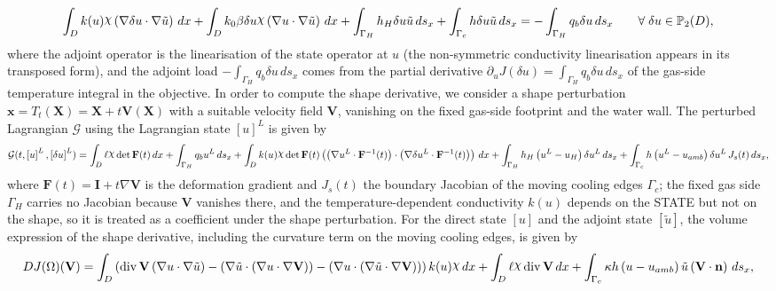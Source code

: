 \documentclass[preview]{standalone}
\let\oldcdot\cdot
\let\cdot\oldcdot
\begin{document}
\begin{dmath*}
\int_{D} k(u) \raisebox{\depth}{$\chi$} \left(  \nabla \delta u  \cdot  \nabla \tilde u  \right) \,dx + \int_{D} k_0 \beta \delta u \raisebox{\depth}{$\chi$} \left(  \nabla u  \cdot  \nabla \tilde u  \right) \,dx + \int_{\Gamma_H} h_H \delta u \tilde u \,ds_x + \int_{\Gamma_c} h \delta u \tilde u \,ds_x = - \int_{\Gamma_H} q_b \delta u \,ds_x \qquad \forall\; {\delta u\in \mathbb P_{2}(D)} ,
\end{dmath*}
where the adjoint operator is the linearisation of the state operator at $u$ (the non-symmetric conductivity linearisation appears in its transposed form), and the adjoint load $- \int_{\Gamma_H} q_b \delta u \,ds_x$ comes from the partial derivative $\partial_{u} J(\delta u) = \int_{\Gamma_H} q_b \delta u \,ds_x$ of the gas-side temperature integral in the objective.
In order to compute the shape derivative, we consider a shape perturbation $\mathbf x = T_t(\mathbf X) = \mathbf X + t \mathbf  V(\mathbf X)$ with a suitable velocity field $\mathbf V$, vanishing on the fixed gas-side footprint and the water wall.  The perturbed Lagrangian $\mathcal G$ using the Lagrangian state $\left[ u\right]^{L}$ is given by
\begin{dmath*}
\mathcal G(t,\left[ u\right]^{L},\left[ \delta u\right]^{L}) = \int_{D} \ell \raisebox{\depth}{$\chi$}  \operatorname{det}\mathbf F( t )  \,dx + \int_{\Gamma_H} q_b u^{L} \,ds_x +  \int_{D} k(u) \raisebox{\depth}{$\chi$}  \operatorname{det}\mathbf F( t )  \left( \left(  \nabla u^{L} \cdot  \mathbf F^{-1}(t) \right) \cdot \left(  \nabla \delta u^{L} \cdot  \mathbf F^{-1}(t) \right) \right) \,dx + \int_{\Gamma_H} h_H \left( u^{L} - u_{H}\right) \delta u^{L} \,ds_x + \int_{\Gamma_c} h \left( u^{L} - u_{amb}\right) \delta u^{L} \,J_{s}(t) \,ds_x ,
\end{dmath*}
where $\mathbf F(t) = \mathbf I + t \nabla \mathbf V$ is the deformation gradient and $J_{s}(t)$ the boundary Jacobian of the moving cooling edges $\Gamma_c$; the fixed gas side $\Gamma_H$ carries no Jacobian because $\mathbf V$ vanishes there, and the temperature-dependent conductivity $k(u)$ depends on the STATE but not on the shape, so it is treated as a coefficient under the shape perturbation.
For the direct state $\left[ u\right]$ and the adjoint state $\left[ \tilde u\right]$, the volume expression of the shape derivative, including the curvature term on the moving cooling edges, is given by
\begin{dmath*}
DJ(\Omega)(\mathbf V) = \int_{D} \left(\operatorname{div} {\mathbf V} \left(  \nabla u  \cdot  \nabla \tilde u  \right) - \left(  \nabla \tilde u  \cdot \left(  \nabla u  \cdot  \nabla {\mathbf V}  \right) \right) - \left(  \nabla u  \cdot \left(  \nabla \tilde u  \cdot  \nabla {\mathbf V}  \right) \right)\right) k(u) \raisebox{\depth}{$\chi$} \,dx + \int_{D} \ell \raisebox{\depth}{$\chi$} \operatorname{div} {\mathbf V} \,dx + \int_{\Gamma_c} \kappa h \left( u - u_{amb}\right) \tilde u \left(\mathbf V \cdot \mathbf n\right) \,ds_x ,
\end{dmath*}
\end{document}
